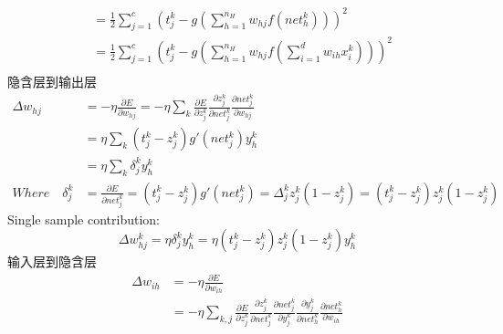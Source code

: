 \documentclass[a4paper,11pt,onecolumn,oneside,UTF8]{article}
\begin{document}
\begin{enumerate}
$$\begin{aligned}
                                       & =\frac{1}{2}\sum\limits_{j=1}^c\left(t_j^k-g\left(\sum\limits_{h=1}^{n_H}w_{hj}f\left(net_h^k\right)\right)\right)^2                                             \\
                                       & =\frac{1}{2}\sum\limits_{j=1}^c\left(t_j^k-g\left(\sum\limits_{h=1}^{n_H}w_{hj}f\left(\sum\limits_{i=1}^{d}w_{ih}x_i^k\right)\right)\right)^2                    \\
              \end{aligned}
          $$
          隐含层到输出层
          $$
              \begin{aligned}
                  \Delta w_{hj}         & =-\eta\frac{\partial E}{\partial w_{hj}}=-\eta\sum\limits_{k}\frac{\partial E}{\partial z_{j}^k}\frac{\partial z_{j}^k}{\partial net_{j}^k}\frac{\partial net_{j}^k}{\partial w_{hj}} \\
                                        & =\eta\sum\limits_{k}\left(t_j^k-z_j^k\right)g'\left(net_j^k\right)y_h^k                                                                                                               \\
                                        & =\eta\sum\limits_{k}\delta_j^ky_h^k                                                                                                                                                   \\
                  Where\quad \delta_j^k & =\frac{\partial E}{\partial net_{j}^k}=\left(t_j^k-z_j^k\right)g'\left(net_j^k\right)=\Delta_j^kz_j^k\left(1-z_j^k\right)=\left(t_j^k-z_j^k\right)z_j^k\left(1-z_j^k\right)
              \end{aligned}
          $$
          Single sample contribution:
          $$
              \Delta w_{hj}^k =\eta\delta_j^ky_h^k=\eta\left(t_j^k-z_j^k\right)z_j^k\left(1-z_j^k\right)y_h^k
          $$
          输入层到隐含层
          $$
              \begin{aligned}
                  \Delta w_{ih}          & =-\eta\frac{\partial E}{\partial w_{ih}}                                                                                                                                                                                                                                                      \\
                                         & =-\eta\sum\limits_{k,j}\frac{\partial E}{\partial z_{j}^k}\frac{\partial z_{j}^k}{\partial net_{j}^k}\frac{\partial net_{j}^k}{\partial y_{j}^k}\frac{\partial y_{j}^k}{\partial net_{h}^k}\frac{\partial net_{h}^k}{\partial w_{ih}}                                                         \\

\end{aligned}$$
\end{enumerate}
\end{document}
